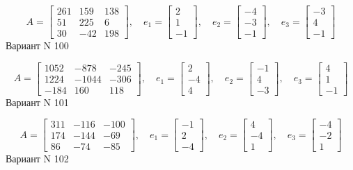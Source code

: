 \documentclass[11pt]{report}
\begin{document}
$$A = \left[\begin{matrix}261 & 159 & 138\\51 & 225 & 6\\30 & -42 & 198\end{matrix}\right],\quad e_1 = \left[\begin{matrix}2\\1\\-1\end{matrix}\right],\quad e_2 = \left[\begin{matrix}-4\\-3\\-1\end{matrix}\right],\quad e_3 = \left[\begin{matrix}-3\\4\\-1\end{matrix}\right]$$Вариант N 100

$$A = \left[\begin{matrix}1052 & -878 & -245\\1224 & -1044 & -306\\-184 & 160 & 118\end{matrix}\right],\quad e_1 = \left[\begin{matrix}2\\-4\\4\end{matrix}\right],\quad e_2 = \left[\begin{matrix}-1\\4\\-3\end{matrix}\right],\quad e_3 = \left[\begin{matrix}4\\1\\-1\end{matrix}\right]$$Вариант N 101

$$A = \left[\begin{matrix}311 & -116 & -100\\174 & -144 & -69\\86 & -74 & -85\end{matrix}\right],\quad e_1 = \left[\begin{matrix}-1\\2\\-4\end{matrix}\right],\quad e_2 = \left[\begin{matrix}4\\-4\\1\end{matrix}\right],\quad e_3 = \left[\begin{matrix}-4\\-2\\1\end{matrix}\right]$$Вариант N 102
\end{document}
